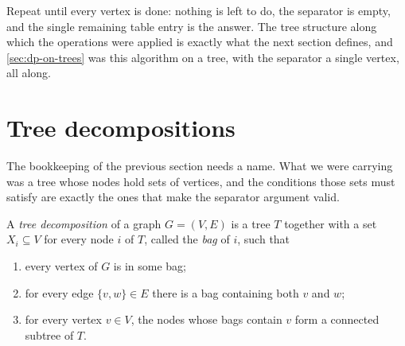Repeat until every vertex is done: nothing is left to do, the separator is
empty, and the single remaining table entry is the answer. The tree structure
along which the operations were applied is exactly what the next section
defines, and \cref{sec:dp-on-trees} was this algorithm on a tree, with the
separator a single vertex, all along.

\section{Tree decompositions}
\label{sec:tree-decompositions}

The bookkeeping of the previous section needs a name. What we were carrying was
a tree whose nodes hold sets of vertices, and the conditions those sets must
satisfy are exactly the ones that make the separator argument valid.

\begin{definition}\label{def:tree-decomposition}
A \emph{tree decomposition} of a graph $G = (V,E)$ is a tree $T$ together with a
set $X_i \subseteq V$ for every node $i$ of $T$, called the \emph{bag} of $i$,
such that
\begin{enumerate}[label=(\roman*),leftmargin=*]
  \item every vertex of $G$ is in some bag;
  \item for every edge $\{v,w\} \in E$ there is a bag containing both $v$ and
        $w$;
  \item for every vertex $v \in V$, the nodes whose bags contain $v$ form a
        connected subtree of $T$.
\end{enumerate}
\end{definition}

